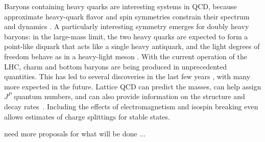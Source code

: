 Baryons containing heavy quarks are interesting systems in QCD, because approximate heavy-quark flavor and spin symmetries
constrain their spectrum and dynamics \cite{Korner:1994nh, Manohar:2000dt}. A particularly interesting symmetry emerges for doubly heavy baryons: in the large-mass limit, the two heavy quarks
are expected to form a point-like diquark that acts like a single heavy antiquark, and the light degrees of freedom behave as in a
heavy-light meson \cite{Savage:1990di, Brambilla:2005yk}. With the current operation of the LHC, charm and bottom baryons are being produced in unprecedented quantities.
This has led to several discoveries in the last few years \cite{Chatrchyan:2012ni, Aaij:2012da, Aaij:2014yka, Aaij:2016jnn, Aaij:2017ueg,  Aaij:2017vbw, Aaij:2017nav}, with many more expected in the future. Lattice QCD
can predict the masses, can help assign $J^P$ quantum numbers, and can also provide information on the structure and decay rates~\cite{Brown:2014ena, Padmanath:2015jea, Bali:2015lka, Alexandrou:2017xwd}. Including the effects of electromagnetism and isospin breaking even allows estimates of charge splittings for stable states\cite{Borsanyi:2014jba}.




{\color{red}
need more proposals for what will be done ... }


